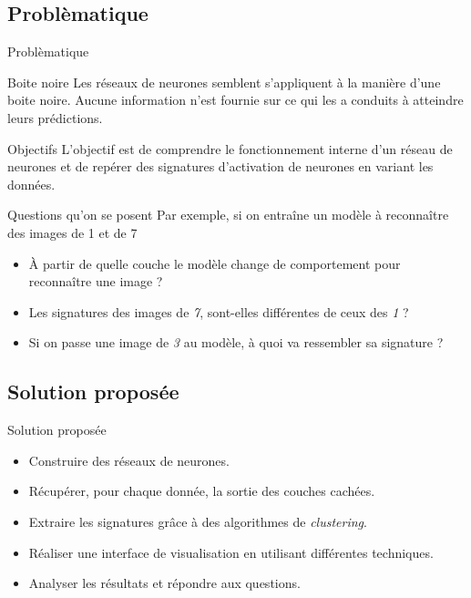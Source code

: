\documentclass[10pt,handout]{beamer}
\newif\ifplacelogo %
\begin{document}
\subsection{Problèmatique}
\begin{frame}{Problèmatique}
    \begin{block}{Boite noire}
        Les réseaux de neurones semblent s'appliquent à la manière d'une boite noire. Aucune information n'est fournie sur ce qui les a conduits à atteindre leurs prédictions.
    \end{block}
    \begin{block}{Objectifs}
        L'objectif est de comprendre le fonctionnement interne d'un réseau de neurones et de repérer des signatures d'activation de neurones en variant les données.
    \end{block}

        
\end{frame}
\placelogotrue

\begin{frame}{Questions qu'on se posent}
    Par exemple, si on entraîne un modèle à reconnaître des images de 1 et de 7
    \begin{itemize}
        \item À partir de quelle couche le modèle change de comportement pour reconnaître une image ?
        \item Les signatures des images de \textit{7}, sont-elles différentes de ceux des \textit{1} ?
        \item Si on passe une image de \textit{3} au modèle, à quoi va ressembler sa signature ?
    \end{itemize}    
\end{frame}

\subsection{Solution proposée}
\begin{frame}{Solution proposée}
    \begin{itemize}
        \item Construire des réseaux de neurones.
        \item Récupérer, pour chaque donnée, la sortie des couches cachées.
        \item Extraire les signatures grâce à des algorithmes de \textit{clustering}.
        \item Réaliser une interface de visualisation en utilisant différentes techniques.
        \item Analyser les résultats et répondre aux questions.
    \end{itemize}
\end{frame}
\end{document}

